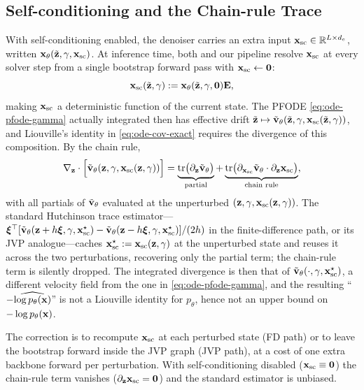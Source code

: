 \documentclass{article}
\begin{document}
\subsection{Self-conditioning and the Chain-rule Trace}
\label{subsec:ode-likelihood-selfcond}

With self-conditioning enabled, the denoiser carries an extra input ${\mathbf x}_{\mathrm{sc}}\in\mathbb{R}^{L\times d_e}$, written ${\mathbf x}_\theta(\tilde{{\mathbf z}},\gamma,{\mathbf x}_{\mathrm{sc}})$. At inference time, both \citet{chen2026langflow} and our pipeline resolve ${\mathbf x}_{\mathrm{sc}}$ at every solver step from a single bootstrap forward pass with ${\mathbf x}_{\mathrm{sc}} \gets {\mathbf 0}$:
\begin{equation*}
  {\mathbf x}_{\mathrm{sc}}(\tilde{{\mathbf z}},\gamma) := {\mathbf x}_\theta(\tilde{{\mathbf z}},\gamma,{\mathbf 0}){\mathbf E},
\end{equation*}
making ${\mathbf x}_{\mathrm{sc}}$ a deterministic function of the current state. The PFODE \cref{eq:ode-pfode-gamma} actually integrated then has effective drift $\tilde{{\mathbf z}}\mapsto\tilde{{\mathbf v}}_\theta(\tilde{{\mathbf z}},\gamma,{\mathbf x}_{\mathrm{sc}}(\tilde{{\mathbf z}},\gamma))$, and Liouville's identity in \cref{eq:ode-cov-exact} requires the divergence of this composition. By the chain rule,
\begin{equation}\label{eq:ode-selfcond-divergence}
  \nabla_{\mathbf z}\cdot\Bigl[\tilde{{\mathbf v}}_\theta({\mathbf z},\gamma,{\mathbf x}_{\mathrm{sc}}({\mathbf z},\gamma))\Bigr] = \underbrace{\operatorname{tr}\bigl(\partial_{\mathbf z}\tilde{{\mathbf v}}_\theta\bigr)}_{\text{partial}} + \underbrace{\operatorname{tr}\bigl(\partial_{{\mathbf x}_{\mathrm{sc}}}\tilde{{\mathbf v}}_\theta\cdot\partial_{\mathbf z}{\mathbf x}_{\mathrm{sc}}\bigr)}_{\text{chain rule}},
\end{equation}
with all partials of $\tilde{{\mathbf v}}_\theta$ evaluated at the unperturbed $({\mathbf z},\gamma,{\mathbf x}_{\mathrm{sc}}({\mathbf z},\gamma))$. The standard Hutchinson trace estimator---${\boldsymbol{\xi}}^\top[\tilde{{\mathbf v}}_\theta({\mathbf z}+h{\boldsymbol{\xi}},\gamma,{\mathbf x}_{\mathrm{sc}}^\star) - \tilde{{\mathbf v}}_\theta({\mathbf z}-h{\boldsymbol{\xi}},\gamma,{\mathbf x}_{\mathrm{sc}}^\star)]/(2h)$ in the finite-difference path, or its JVP analogue---caches ${\mathbf x}_{\mathrm{sc}}^\star := {\mathbf x}_{\mathrm{sc}}({\mathbf z},\gamma)$ at the unperturbed state and reuses it across the two perturbations, recovering only the partial term; the chain-rule term is silently dropped. The integrated divergence is then that of $\tilde{{\mathbf v}}_\theta(\cdot,\gamma,{\mathbf x}_{\mathrm{sc}}^\star)$, a different velocity field from the one in \cref{eq:ode-pfode-gamma}, and the resulting ``$-\widehat{\log p_\theta({\mathbf x})}$'' is not a Liouville identity for $p_\theta$, hence not an upper bound on $-\log p_\theta({\mathbf x})$.

The correction is to recompute ${\mathbf x}_{\mathrm{sc}}$ at each perturbed state (FD path) or to leave the bootstrap forward inside the JVP graph (JVP path), at a cost of one extra backbone forward per perturbation. With self-conditioning disabled (${\mathbf x}_{\mathrm{sc}} \equiv {\mathbf 0}$) the chain-rule term vanishes ($\partial_{\mathbf z}{\mathbf x}_{\mathrm{sc}} = {\mathbf 0}$) and the standard estimator is unbiased.
\end{document}
